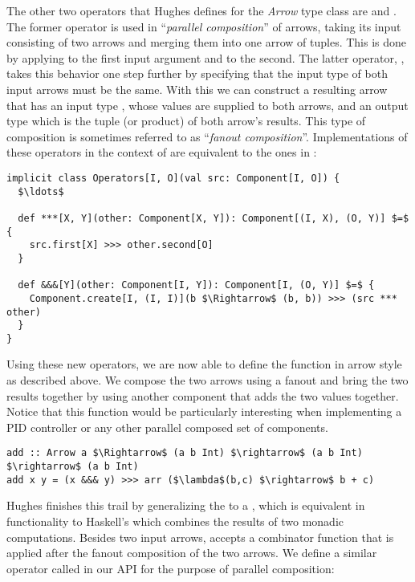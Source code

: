 The other two operators that Hughes defines for the \textit{Arrow} type class are \code{(***)} and \code{(\&\&\&)}. The former operator is used in ``\textit{parallel composition}'' of arrows, taking its input consisting of two arrows and merging them into one arrow of tuples. This is done by applying  to the first input argument and  to the second. The latter operator, \code{(\&\&\&)}, takes this behavior one step further by specifying that the input type of both input arrows must be the same. With this we can construct a resulting arrow that has an input type , whose values are supplied to both arrows, and an output type which is the tuple (or product) of both arrow's results. This type of composition is sometimes referred to as ``\textit{fanout composition}''. Implementations of these operators in the context of \comp are equivalent to the ones in :

\begin{lstlisting}[style=InlineScalaStyle]
implicit class Operators[I, O](val src: Component[I, O]) {
  $\ldots$

  def ***[X, Y](other: Component[X, Y]): Component[(I, X), (O, Y)] $=$ {
    src.first[X] >>> other.second[O]
  }

  def &&&[Y](other: Component[I, Y]): Component[I, (O, Y)] $=$ {
    Component.create[I, (I, I)](b $\Rightarrow$ (b, b)) >>> (src *** other)
  }
}
\end{lstlisting}

Using these new operators, we are now able to define the  function in arrow style as described above. We compose the two arrows using a fanout and bring the two results together by using another component that adds the two values together. Notice that this function would be particularly interesting when implementing a PID controller or any other parallel composed set of components.

\begin{lstlisting}[style=InlineHaskellStyle]
add :: Arrow a $\Rightarrow$ (a b Int) $\rightarrow$ (a b Int) $\rightarrow$ (a b Int)
add x y = (x &&& y) >>> arr ($\lambda$(b,c) $\rightarrow$ b + c)
\end{lstlisting}

Hughes finishes this trail by generalizing the  to a , which is equivalent in functionality to Haskell's  which combines the results of two monadic computations. Besides two input arrows,  accepts a combinator function that is applied after the fanout composition of the two arrows. We define a similar operator called  in our API for the purpose of parallel composition:

